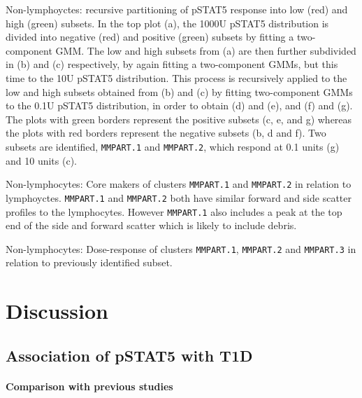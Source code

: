 %
{ Non-lymphoyctes: recursive partitioning of pSTAT5 response into low (red) and high (green) subsets. }
{
    In the top plot (a), the 1000U pSTAT5 distribution is divided into negative (red) and positive (green) subsets by fitting a two-component \gls{GMM}.
    The low and high subsets from (a) are then further subdivided in (b) and (c) respectively, by again fitting a two-component \glspl{GMM},
    but this time to the 10U pSTAT5 distribution.
    This process is recursively applied to the low and high subsets obtained from (b) and (c) by fitting two-component \glspl{GMM} to the 0.1U pSTAT5 distribution, in order
    to obtain (d) and (e), and (f) and (g).
    The plots with green borders represent the positive subsets (c, e, and g) whereas the plots with red borders represent the negative subsets (b, d and f).
    Two subsets are identified, \texttt{MMPART.1} and \texttt{MMPART.2}, which respond at 0.1 units (g) and 10 units (c).
}

%
{ Non-lymphocytes: Core makers of clusters \texttt{MMPART.1} and \texttt{MMPART.2} in relation to lymphoyctes. }
{
    \texttt{MMPART.1} and \texttt{MMPART.2} both have similar forward and side scatter profiles to the lymphocytes.
    However \texttt{MMPART.1} also includes a peak at the top end of the side and forward scatter which is likely to include debris.
}


{ Non-lymphocytes: Dose-response of clusters \texttt{MMPART.1}, \texttt{MMPART.2} and \texttt{MMPART.3} in relation to previously identified subset. }
{ }

\clearpage


\section{Discussion}

\subsection{Association of pSTAT5 with T1D}

\paragraph{Comparison with previous studies}

